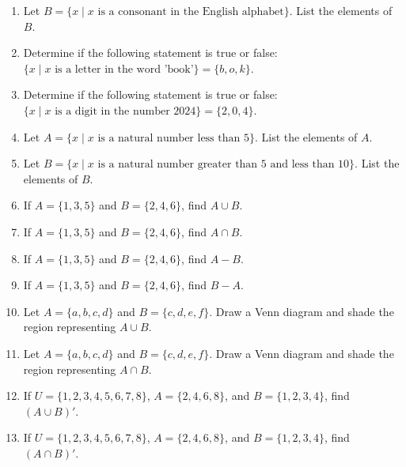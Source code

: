 \documentclass[12pt]{article}
\begin{document}
\begin{enumerate}
    \item Let \( B = \{x \mid x \text{ is a consonant in the English alphabet} \} \). List the elements of \( B \).

    \item Determine if the following statement is true or false: \( \{x \mid x \text{ is a letter in the word 'book'}\} = \{b, o, k\} \).

    \item Determine if the following statement is true or false: \( \{x \mid x \text{ is a digit in the number 2024}\} = \{2, 0, 4\} \).

    \item Let \( A = \{x \mid x \text{ is a natural number less than 5} \} \). List the elements of \( A \).

    \item Let \( B = \{x \mid x \text{ is a natural number greater than 5 and less than 10} \} \). List the elements of \( B \).

    \item If \( A = \{1, 3, 5\} \) and \( B = \{2, 4, 6\} \), find \( A \cup B \).

    \item If \( A = \{1, 3, 5\} \) and \( B = \{2, 4, 6\} \), find \( A \cap B \).

    \item If \( A = \{1, 3, 5\} \) and \( B = \{2, 4, 6\} \), find \( A - B \).

    \item If \( A = \{1, 3, 5\} \) and \( B = \{2, 4, 6\} \), find \( B - A \).

    \item Let \( A = \{a, b, c, d\} \) and \( B = \{c, d, e, f\} \). Draw a Venn diagram and shade the region representing \( A \cup B \).

    \item Let \( A = \{a, b, c, d\} \) and \( B = \{c, d, e, f\} \). Draw a Venn diagram and shade the region representing \( A \cap B \).

    \item If \( U = \{1, 2, 3, 4, 5, 6, 7, 8\} \), \( A = \{2, 4, 6, 8\} \), and \( B = \{1, 2, 3, 4\} \), find \( (A \cup B)' \).

    \item If \( U = \{1, 2, 3, 4, 5, 6, 7, 8\} \), \( A = \{2, 4, 6, 8\} \), and \( B = \{1, 2, 3, 4\} \), find \( (A \cap B)' \).
\end{enumerate}
\end{document}
